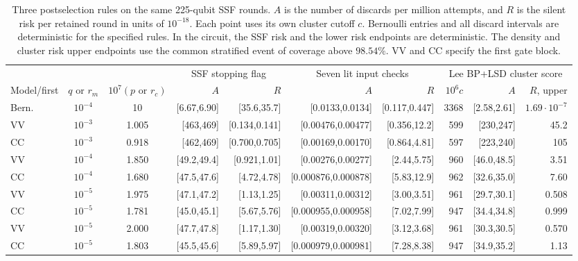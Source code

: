 \documentclass[10pt,twocolumn]{article}
\theoremstyle{definition}
\begin{document}
\begin{table}[t]
\centering\footnotesize
\setlength{\tabcolsep}{3.5pt}
\caption{Three postselection rules on the same 225-qubit SSF rounds.
$A$ is the number of discards per million attempts, and $R$ is the silent
risk per retained round in units of $10^{-18}$. Each point uses its
own cluster cutoff $c$. Bernoulli entries and all discard intervals are
deterministic for the specified rules. In the circuit, the SSF risk and
the lower risk endpoints are deterministic. The density and cluster
risk upper endpoints use the common stratified event of coverage above
$98.54\%$. VV and CC specify the first gate block.}
\label{tab:input-postselection}
\smallskip
\begin{tabular}{@{}lcc rr rr rrr@{}}
\toprule
 & & & \multicolumn{2}{c}{SSF stopping flag} &
 \multicolumn{2}{c}{Seven lit input checks} &
\multicolumn{3}{c}{Lee BP+LSD cluster score}\\
\cmidrule(lr){4-5}\cmidrule(lr){6-7}\cmidrule(l){8-10}
Model/first & $q$ or $r_m$ & $10^7(p\text{ or }r_c)$ &
 $A$ & $R$ & $A$ & $R$ & $10^6c$ & $A$ & $R$, upper\\
\midrule
Bern. & $10^{-4}$ & 10 & [6.67,6.90] & [35.6,35.7] & [0.0133,0.0134] & [0.117,0.447] & 3368 & [2.58,2.61] & $1.69\cdot10^{-7}$ \\
VV & $10^{-3}$ & 1.005 & [463,469] & [0.134,0.141] & [0.00476,0.00477] & [0.356,12.2] & 599 & [230,247] & 45.2 \\
CC & $10^{-3}$ & 0.918 & [462,469] & [0.700,0.705] & [0.00169,0.00170] & [0.864,4.81] & 597 & [223,240] & 105 \\
VV & $10^{-4}$ & 1.850 & [49.2,49.4] & [0.921,1.01] & [0.00276,0.00277] & [2.44,5.75] & 960 & [46.0,48.5] & 3.51 \\
CC & $10^{-4}$ & 1.680 & [47.5,47.6] & [4.72,4.78] & [0.000876,0.000878] & [5.83,12.9] & 962 & [32.6,35.0] & 7.60 \\
VV & $10^{-5}$ & 1.975 & [47.1,47.2] & [1.13,1.25] & [0.00311,0.00312] & [3.00,3.51] & 961 & [29.7,30.1] & 0.508 \\
CC & $10^{-5}$ & 1.781 & [45.0,45.1] & [5.67,5.76] & [0.000955,0.000958] & [7.02,7.99] & 947 & [34.4,34.8] & 0.999 \\
VV & $10^{-5}$ & 2.000 & [47.7,47.8] & [1.17,1.30] & [0.00319,0.00320] & [3.12,3.68] & 961 & [30.3,30.5] & 0.570 \\
CC & $10^{-5}$ & 1.803 & [45.5,45.6] & [5.89,5.97] & [0.000979,0.000981] & [7.28,8.38] & 947 & [34.9,35.2] & 1.13 \\
\bottomrule
\end{tabular}
\end{table}
\end{document}
